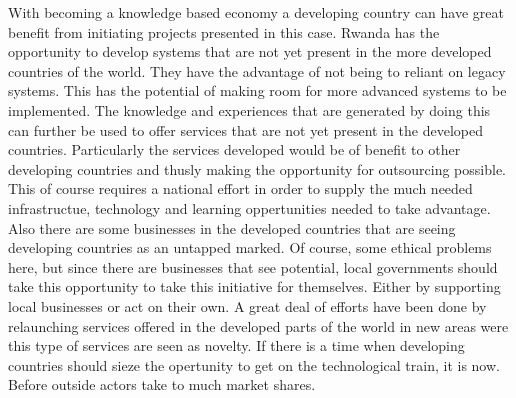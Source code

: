 With becoming a knowledge based economy a developing country can have great benefit from initiating projects presented in this case.
Rwanda has the opportunity to develop systems that are not yet present in the more developed countries of the world.
They have the advantage of not being to reliant on legacy systems. 
This has the potential of making room for more advanced systems to be implemented. 
The knowledge and experiences that are generated by doing this can further be used to offer services that are not yet present in the developed countries. 
Particularly the services developed would be of benefit to other developing countries and thusly making the opportunity for outsourcing possible. 
This of course requires a national effort in order to supply the much needed infrastructue, technology and learning oppertunities needed to take advantage. 
Also there are some businesses in the developed countries that are seeing developing countries as an untapped marked.
Of course, some ethical problems here, but since there are businesses that see potential, local governments should take this opportunity to take this initiative for themselves. Either by supporting local businesses or act on their own. 
A great deal of efforts have been done by relaunching services offered in the developed parts of the world in new areas were this type of services are seen as novelty.
If there is a time when developing countries should sieze the opertunity to get on the technological train, it is now. 
Before outside actors take to much market shares. 



\cite{overview:rdb}
\cite{rw:snl}

